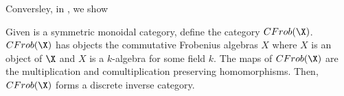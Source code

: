 Conversley, in \cite{gilescockett09}, we show
\begin{theorem}
  Given \X is a symmetric monoidal category, define the category $CFrob(\X)$. $CFrob(\X)$ has
  objects the commutative Frobenius algebras $X$ where $X$ is an object of $\X$ and $X$ is a
  $k$-algebra for some field $k$. The maps of $CFrob(\X)$ are the multiplication and
  comultiplication preserving homomorphisms. Then, $CFrob(\X)$ forms a discrete inverse category.
\end{theorem}
